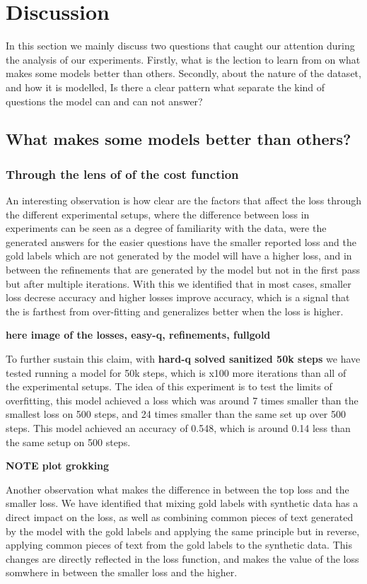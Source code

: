 \documentclass[a4paper,10pt]{article}
\begin{document}
\section{Discussion}
In this section we mainly discuss two questions that caught our attention during the analysis of our experiments. Firstly, what is the lection to learn from on what makes some models better than others. Secondly, about the nature of the dataset, and how it is modelled, Is there a clear pattern what separate the kind of questions the model can and can not answer?
\subsection{What makes some models better than others?}
\subsubsection{Through the lens of of the cost function}
An interesting observation is how clear are the factors that affect the loss through the different experimental setups, where the difference between loss in experiments can be seen as a degree of familiarity with the data, were the generated answers for the easier questions have the smaller reported loss and the gold labels which are not generated by the model will have a higher loss, and in between the refinements that are generated by the model but not in the first pass but after multiple iterations. With this we identified that in most cases, smaller loss decrese accuracy and higher losses improve accuracy, which is a signal that the is farthest from over-fitting and generalizes better when the loss is higher.

\textbf{here image of the losses, easy-q, refinements, fullgold}

To further sustain this claim, with \textbf{hard-q solved sanitized 50k steps} we have tested running a model for 50k steps, which is x100 more iterations than all of the experimental setups. The idea of this experiment is to test the limits of overfitting, this model achieved a loss which was around 7 times smaller than the smallest loss on 500 steps, and 24 times smaller than the same set up over 500 steps. This model achieved an accuracy of 0.548, which is around 0.14 less than the same setup on 500 steps.

\textbf{NOTE plot grokking}


Another observation what makes the difference in between the top loss and the smaller loss. We have identified that mixing gold labels with synthetic data has a direct impact on the loss, as well as combining common pieces of text generated by the model with the gold labels and applying the same principle but in reverse, applying common pieces of text from the gold labels to the synthetic data. This changes are directly reflected in the loss function, and makes the value of the loss somwhere in between the smaller loss and the higher. 
\end{document}
